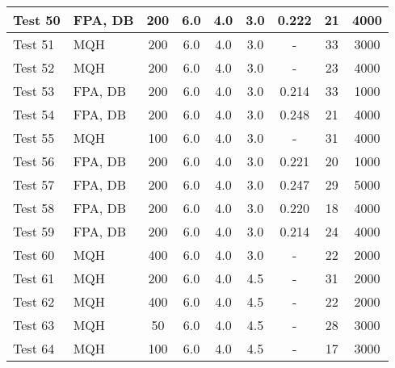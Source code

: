 \begin{table}[!ht]
\begin{center}
\begin{tabular}{|l|l|c|c|c|c|c|c|c|}
Test 50    &  FPA, DB           &  200            &  6.0       &  4.0       &  3.0       &  0.222          &  21                &  4000              \\ \hline
Test 51    &  MQH               &  200            &  6.0       &  4.0       &  3.0       &  -              &  33                &  3000              \\ \hline
Test 52    &  MQH               &  200            &  6.0       &  4.0       &  3.0       &  -              &  23                &  4000              \\ \hline
Test 53    &  FPA, DB           &  200            &  6.0       &  4.0       &  3.0       &  0.214          &  33                &  1000              \\ \hline
Test 54    &  FPA, DB           &  200            &  6.0       &  4.0       &  3.0       &  0.248          &  21                &  4000              \\ \hline
Test 55    &  MQH               &  100            &  6.0       &  4.0       &  3.0       &  -              &  31                &  4000              \\ \hline
Test 56    &  FPA, DB           &  200            &  6.0       &  4.0       &  3.0       &  0.221          &  20                &  1000              \\ \hline
Test 57    &  FPA, DB           &  200            &  6.0       &  4.0       &  3.0       &  0.247          &  29                &  5000              \\ \hline
Test 58    &  FPA, DB           &  200            &  6.0       &  4.0       &  3.0       &  0.220          &  18                &  4000              \\ \hline
Test 59    &  FPA, DB           &  200            &  6.0       &  4.0       &  3.0       &  0.214          &  24                &  4000              \\ \hline
Test 60    &  MQH               &  400            &  6.0       &  4.0       &  3.0       &  -              &  22                &  2000              \\ \hline
Test 61    &  MQH               &  200            &  6.0       &  4.0       &  4.5       &  -              &  31                &  2000              \\ \hline
Test 62    &  MQH               &  400            &  6.0       &  4.0       &  4.5       &  -              &  22                &  2000              \\ \hline
Test 63    &  MQH               &  50             &  6.0       &  4.0       &  4.5       &  -              &  28                &  3000              \\ \hline
Test 64    &  MQH               &  100            &  6.0       &  4.0       &  4.5       &  -              &  17                &  3000              \\ \hline
\end{tabular}
\end{center}
\end{table}


